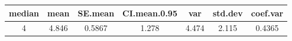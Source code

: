 \documentclass[]{article}
\begin{document}
\begin{longtable}[]{@{}ccccccc@{}}
\toprule
\begin{minipage}[b]{0.10\columnwidth}\centering\strut
median\strut
\end{minipage} & \begin{minipage}[b]{0.09\columnwidth}\centering\strut
mean\strut
\end{minipage} & \begin{minipage}[b]{0.11\columnwidth}\centering\strut
SE.mean\strut
\end{minipage} & \begin{minipage}[b]{0.17\columnwidth}\centering\strut
CI.mean.0.95\strut
\end{minipage} & \begin{minipage}[b]{0.09\columnwidth}\centering\strut
var\strut
\end{minipage} & \begin{minipage}[b]{0.11\columnwidth}\centering\strut
std.dev\strut
\end{minipage} & \begin{minipage}[b]{0.11\columnwidth}\centering\strut
coef.var\strut
\end{minipage}\tabularnewline
\midrule
\endhead
\begin{minipage}[t]{0.10\columnwidth}\centering\strut
4\strut
\end{minipage} & \begin{minipage}[t]{0.09\columnwidth}\centering\strut
4.846\strut
\end{minipage} & \begin{minipage}[t]{0.11\columnwidth}\centering\strut
0.5867\strut
\end{minipage} & \begin{minipage}[t]{0.17\columnwidth}\centering\strut
1.278\strut
\end{minipage} & \begin{minipage}[t]{0.09\columnwidth}\centering\strut
4.474\strut
\end{minipage} & \begin{minipage}[t]{0.11\columnwidth}\centering\strut
2.115\strut
\end{minipage} & \begin{minipage}[t]{0.11\columnwidth}\centering\strut
0.4365\strut
\end{minipage}\tabularnewline
\bottomrule
\end{longtable}
\end{document}
